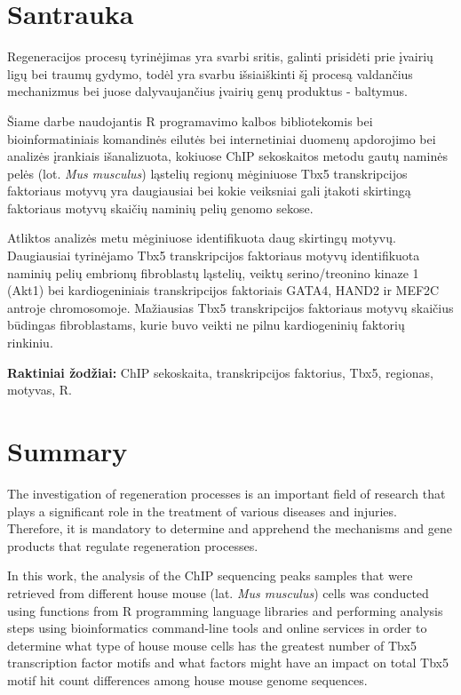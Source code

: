 \documentclass[12pt]{article}
\begin{document}
\section*{Santrauka}
Regeneracijos procesų tyrinėjimas yra svarbi sritis, galinti prisidėti prie
įvairių ligų bei traumų gydymo, todėl yra svarbu išsiaiškinti šį procesą
valdančius mechanizmus bei juose dalyvaujančius įvairių genų produktus -
baltymus.
                                                                                     
Šiame darbe naudojantis R programavimo kalbos bibliotekomis bei
bioinformatiniais komandinės eilutės bei internetiniai duomenų apdorojimo
bei analizės įrankiais išanalizuota, kokiuose ChIP sekoskaitos metodu gautų
naminės pelės (lot. \emph{Mus musculus}) ląstelių regionų mėginiuose Tbx5
transkripcijos faktoriaus motyvų yra daugiausiai bei kokie veiksniai gali
įtakoti skirtingą faktoriaus motyvų skaičių naminių pelių genomo sekose.

Atliktos analizės metu mėginiuose identifikuota daug skirtingų motyvų.
Daugiausiai tyrinėjamo Tbx5 transkripcijos faktoriaus motyvų identifikuota
naminių pelių embrionų fibroblastų ląstelių, veiktų serino/treonino kinaze 1
(Akt1) bei kardiogeniniais transkripcijos faktoriais GATA4, HAND2 ir MEF2C
antroje chromosomoje. Mažiausias Tbx5 transkripcijos faktoriaus motyvų skaičius
būdingas fibroblastams, kurie buvo veikti ne pilnu kardiogeninių faktorių
rinkiniu.

\hfill \break
\textbf{Raktiniai žodžiai:} ChIP sekoskaita, transkripcijos faktorius, Tbx5,
        regionas, motyvas, R.
\newpage


\section*{Summary}
The investigation of regeneration processes is an important field of research
that plays a significant role in the treatment of various diseases and injuries.
Therefore, it is mandatory to determine and apprehend the mechanisms and gene
products that regulate regeneration processes.

In this work, the analysis of the ChIP sequencing peaks samples that were
retrieved from different house mouse (lat. \emph{Mus musculus}) cells was
conducted using functions from R programming language libraries and performing
analysis steps using bioinformatics command-line tools and online services
in order to determine what type of house mouse cells has the greatest number
of Tbx5 transcription factor motifs and what factors might have an impact on
total Tbx5 motif hit count differences among house mouse genome sequences.
\end{document}
